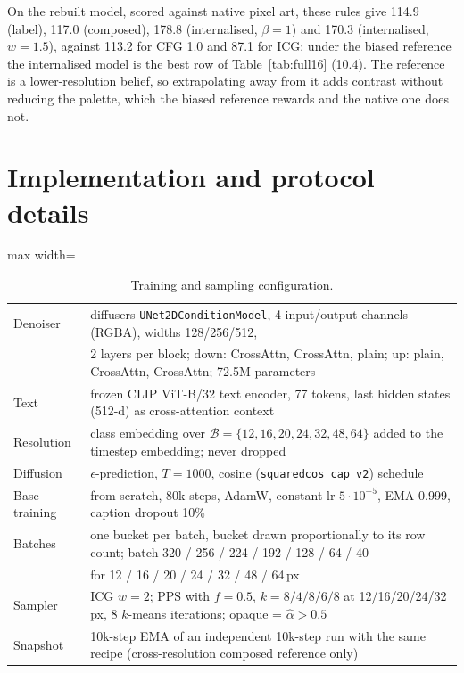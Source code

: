 On the rebuilt model, scored against native pixel art, these rules give 114.9 (label), 117.0 (composed), 178.8
(internalised, $\beta = 1$) and 170.3 (internalised, $w = 1.5$), against 113.2 for CFG 1.0 and 87.1 for ICG; under the
biased reference the internalised model is the best row of Table~\ref{tab:full16} (10.4). The reference is a
lower-resolution belief, so extrapolating away from it adds contrast without reducing the palette, which the biased
reference rewards and the native one does not.

\section{Implementation and protocol details}
\label{app:details}

\begin{table}[h]
\caption{Training and sampling configuration.}
\label{tab:hparams}
\centering
\small
\begin{adjustbox}{max width=\linewidth}
\begin{tabular}{@{}ll@{}}
\toprule
Denoiser & diffusers \texttt{UNet2DConditionModel}, 4 input/output channels (RGBA), widths 128/256/512, \\
 & 2 layers per block; down: CrossAttn, CrossAttn, plain; up: plain, CrossAttn, CrossAttn; 72.5M parameters \\
Text & frozen CLIP ViT-B/32 text encoder, 77 tokens, last hidden states (512-d) as cross-attention context \\
Resolution & class embedding over $\mathcal{B} = \{12,16,20,24,32,48,64\}$ added to the timestep embedding; never dropped \\
Diffusion & $\epsilon$-prediction, $T = 1000$, cosine (\texttt{squaredcos\_cap\_v2}) schedule \\
Base training & from scratch, 80k steps, AdamW, constant lr $5\cdot10^{-5}$, EMA 0.999, caption dropout 10\% \\
Batches & one bucket per batch, bucket drawn proportionally to its row count; batch 320 / 256 / 224 / 192 / 128 / 64 / 40 \\
 & for 12 / 16 / 20 / 24 / 32 / 48 / 64\,px \\
Sampler & ICG $w{=}2$; PPS with $f{=}0.5$, $k{=}8/4/8/6/8$ at 12/16/20/24/32\,px, 8 $k$-means iterations; opaque = $\hat\alpha > 0.5$ \\
Snapshot & 10k-step EMA of an independent 10k-step run with the same recipe (cross-resolution composed reference only) \\

\end{tabular}
\end{adjustbox}
\end{table}
